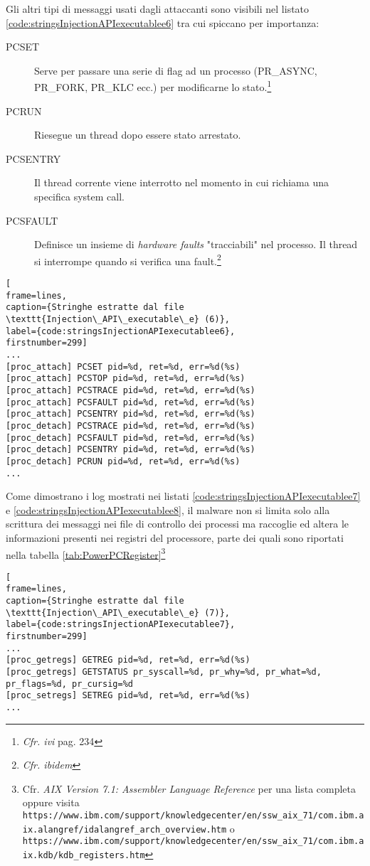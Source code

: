 \documentclass[10pt,a4paper, titlepage]{report}
\begin{document}
Gli altri tipi di messaggi usati dagli attaccanti sono visibili nel listato \ref{code:stringsInjectionAPIexecutablee6} tra cui spiccano per importanza:

\begin{description}
\item[PCSET] Serve per passare una serie di flag ad un processo (PR\_ASYNC, PR\_FORK, PR\_KLC ecc.) per modificarne lo stato.\footnote{\textit{Cfr. ivi} pag. 234} 
\item[PCRUN] Riesegue un thread dopo essere stato arrestato.
\item[PCSENTRY] Il thread corrente viene interrotto nel momento in cui richiama una specifica system call. 
\item[PCSFAULT] Definisce un insieme di \textit{hardware faults} "tracciabili" nel processo. Il thread si interrompe quando si verifica una fault.\footnote{\textit{Cfr. ibidem}} 
\end{description}

\begin{lstlisting}[
frame=lines, 
caption={Stringhe estratte dal file \texttt{Injection\_API\_executable\_e} (6)}, 
label={code:stringsInjectionAPIexecutablee6},
firstnumber=299]
...
[proc_attach] PCSET pid=%d, ret=%d, err=%d(%s)
[proc_attach] PCSTOP pid=%d, ret=%d, err=%d(%s)
[proc_attach] PCSTRACE pid=%d, ret=%d, err=%d(%s)
[proc_attach] PCSFAULT pid=%d, ret=%d, err=%d(%s)
[proc_attach] PCSENTRY pid=%d, ret=%d, err=%d(%s)
[proc_detach] PCSTRACE pid=%d, ret=%d, err=%d(%s)
[proc_detach] PCSFAULT pid=%d, ret=%d, err=%d(%s)
[proc_detach] PCSENTRY pid=%d, ret=%d, err=%d(%s)
[proc_detach] PCRUN pid=%d, ret=%d, err=%d(%s)
...
\end{lstlisting}

Come dimostrano i log mostrati nei listati \ref{code:stringsInjectionAPIexecutablee7} e \ref{code:stringsInjectionAPIexecutablee8}, il malware non si limita solo alla scrittura dei messaggi nei file di controllo dei processi ma raccoglie ed altera le informazioni presenti nei registri del processore, parte dei quali sono riportati nella tabella \ref{tab:PowerPCRegister}\footnote{Cfr. \textit{AIX Version 7.1: Assembler Language Reference} per una lista completa oppure visita \texttt{https://www.ibm.com/support/knowledgecenter/en/ssw\_aix\_71/com.ibm.aix.alangref/idalangref\_arch\_overview.htm} o \texttt{https://www.ibm.com/support/knowledgecenter/en/ssw\_aix\_71/com.ibm.aix.kdb/kdb\_registers.htm}}

\begin{lstlisting}[
frame=lines, 
caption={Stringhe estratte dal file \texttt{Injection\_API\_executable\_e} (7)}, 
label={code:stringsInjectionAPIexecutablee7},
firstnumber=299]
...
[proc_getregs] GETREG pid=%d, ret=%d, err=%d(%s)
[proc_getregs] GETSTATUS pr_syscall=%d, pr_why=%d, pr_what=%d, pr_flags=%d, pr_cursig=%d
[proc_setregs] SETREG pid=%d, ret=%d, err=%d(%s)
...
\end{lstlisting}
\end{document}
